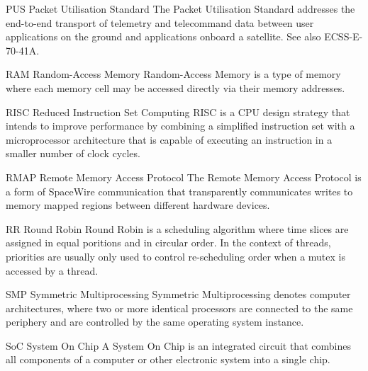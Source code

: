   {PUS}
  {Packet Utilisation Standard}
  {The Packet Utilisation Standard addresses the end-to-end transport of telemetry
   and telecommand data between user applications on the ground and applications
   onboard a satellite. See also ECSS-E-70-41A.}%

%
  {RAM}%
  {Random-Access Memory}%
  {Random-Access Memory is a type of memory where each memory cell may be
   accessed directly via their memory addresses.}%


%
  {RISC}%
  {Reduced Instruction Set Computing}%
  {RISC is a \gls{CPU} design strategy that intends to improve performance by
   combining a simplified instruction set with a microprocessor architecture
   that is capable of executing an instruction in a smaller number of clock
   cycles.}%

%
  {RMAP}%
  {Remote Memory Access Protocol}%
  {The Remote Memory Access Protocol is a form of \gls{SpaceWire} communication
   that transparently communicates writes to memory mapped regions between
   different hardware devices.}%


%
  {RR}%
  {Round Robin}%
  {Round Robin is a scheduling algorithm where time slices are assigned in equal
   poritions and in circular order. In the context of threads, priorities are
   usually only used to control re-scheduling order when a mutex is accessed by
   a thread.}%




%
  {SMP}%
  {Symmetric Multiprocessing}%
  {Symmetric Multiprocessing denotes computer architectures, where two or more
   identical processors are connected to the same periphery and are controlled
   by the same operating system instance.}%





%
  {SoC}%
  {System On Chip}%
  {A System On Chip is an integrated circuit that combines all components of a %
   computer or other electronic system into a single chip.}%

